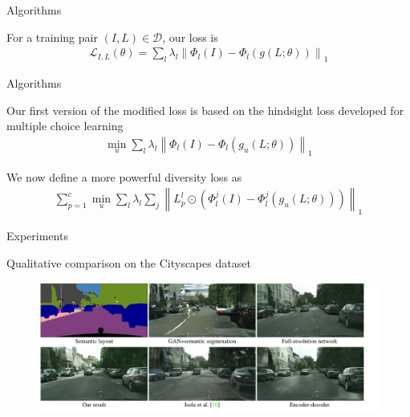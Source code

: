 \documentclass[notes]{beamer}
\begin{document}
\begin{frame}{Algorithms}
	\begin{block}{For a training pair $( I , L ) \in \mathcal { D }$, our loss
is}
		\begin{equation}
			\begin{split}
				\mathcal { L } _ { I , L } ( \theta ) = \sum _ { l } \lambda _ { l } \left\| \Phi _ { l } ( I ) - \Phi _ { l } ( g ( L ; \theta ) ) \right\| _ { 1 }
			\end{split}
		\end{equation}
	\end{block}
\end{frame}

\begin{frame}{Algorithms}
	\begin{block}{Our first version of the
modified loss is based on the hindsight loss developed for
multiple choice learning}
		\begin{equation}
			\begin{split}
				\min _ { u } \sum _ { l } \lambda _ { l } \left\| \Phi _ { l } ( I ) - \Phi _ { l } \left( g _ { u } ( L ; \theta ) \right) \right\| _ { 1 }
			\end{split}
		\end{equation}
	\end{block}
	\begin{block}{We now define a more powerful diversity loss as}
		\begin{equation}
			\begin{split}
				\sum _ { p = 1 } ^ { c } \min _ { u } \sum _ { l } \lambda _ { l } \sum _ { j } \left\| L _ { p } ^ { l } \odot \left( \Phi _ { l } ^ { j } ( I ) - \Phi _ { l } ^ { j } \left( g _ { u } ( L ; \theta ) \right) \right) \right\| _ { 1 }
			\end{split}
		\end{equation}
	\end{block}
\end{frame}

\begin{frame}{Experiments}
	\begin{block}{Qualitative comparison on the Cityscapes dataset}
		\begin{figure}
			\includegraphics[width=1.0\textwidth]{3.png}
		\end{figure}
	\end{block}
\end{frame}
\end{document}
